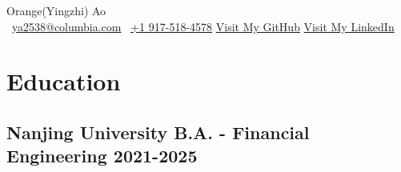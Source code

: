 \documentclass[a4paper]{article}
\newcommand{\org}{\color{org}}
\begin{document}
\begin{center}      
    {\fontsize{28}{28}\selectfont Orange(Yingzhi) Ao} \\ \vspace{10pt}
    {\org\faEnvelope[regular]}\ \href{mailto:ya2538@columbia.edu}{ya2538@columbia.com} \hfill
    {\org{}}\ \href{tel:+1 9175184578}{+1 917-518-4578} \hfill
    {\org\faGithub} \href{https://github.com/OrangeAoo}{Visit My GitHub}  \hfill
    {\org\faLinkedin} \href{http://linkedin.com/in/orange-ao}{Visit My LinkedIn}
\end{center}




\section{Education}  %

\subsection{Nanjing University \normalfont \hfill B.A. - Financial Engineering \hfill 2021-2025}
\end{document}

